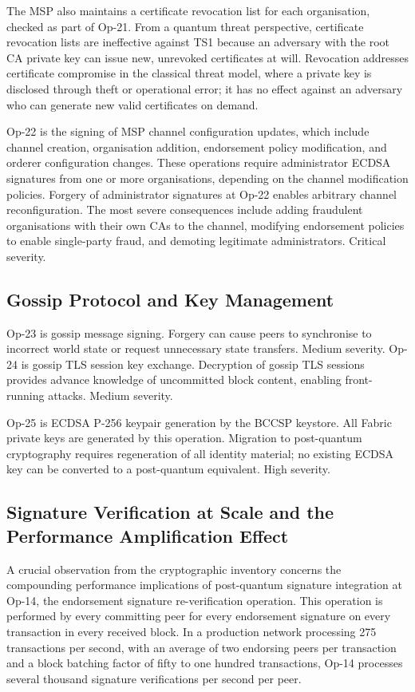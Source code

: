 \documentclass[conference]{IEEEtran}
\begin{document}
The MSP also maintains a certificate revocation list for each organisation,
checked as part of Op-21. From a quantum threat perspective, certificate
revocation lists are ineffective against TS1 because an adversary with the
root CA private key can issue new, unrevoked certificates at will. Revocation
addresses certificate compromise in the classical threat model, where a
private key is disclosed through theft or operational error; it has no
effect against an adversary who can generate new valid certificates on demand.

Op-22 is the signing of MSP channel configuration updates, which include
channel creation, organisation addition, endorsement policy modification,
and orderer configuration changes. These operations require administrator
ECDSA signatures from one or more organisations, depending on the channel
modification policies. Forgery of administrator signatures at Op-22 enables
arbitrary channel reconfiguration. The most severe consequences include
adding fraudulent organisations with their own CAs to the channel, modifying
endorsement policies to enable single-party fraud, and demoting legitimate
administrators. Critical severity.

\subsection{Gossip Protocol and Key Management}

Op-23 is gossip message signing. Forgery can cause peers to synchronise
to incorrect world state or request unnecessary state transfers. Medium
severity. Op-24 is gossip TLS session key exchange. Decryption of gossip
TLS sessions provides advance knowledge of uncommitted block content,
enabling front-running attacks. Medium severity.

Op-25 is ECDSA P-256 keypair generation by the BCCSP keystore. All
Fabric private keys are generated by this operation. Migration to
post-quantum cryptography requires regeneration of all identity material;
no existing ECDSA key can be converted to a post-quantum equivalent.
High severity.


\subsection{Signature Verification at Scale and the Performance Amplification Effect}
\label{sec:tm_scale}

A crucial observation from the cryptographic inventory concerns the
compounding performance implications of post-quantum signature integration
at Op-14, the endorsement signature re-verification operation. This operation
is performed by every committing peer for every endorsement signature on every
transaction in every received block. In a production network processing 275
transactions per second, with an average of two endorsing peers per
transaction and a block batching factor of fifty to one hundred transactions,
Op-14 processes several thousand signature verifications per second per peer.
\end{document}
